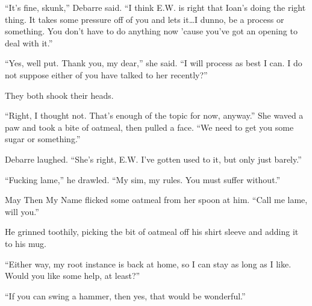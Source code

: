 ``It's fine, skunk,'' Debarre said. ``I think E.W. is right that Ioan's doing the right thing. It takes some pressure off of you and lets it\ldots I dunno, be a process or something. You don't have to do anything now 'cause you've got an opening to deal with it.''

``Yes, well put. Thank you, my dear,'' she said. ``I will process as best I can. I do not suppose either of you have talked to her recently?''

They both shook their heads.

``Right, I thought not. That's enough of the topic for now, anyway.'' She waved a paw and took a bite of oatmeal, then pulled a face. ``We need to get you some sugar or something.''

Debarre laughed. ``She's right, E.W. I've gotten used to it, but only just barely.''

``Fucking lame,'' he drawled. ``My sim, my rules. You must suffer without.''

May Then My Name flicked some oatmeal from her spoon at him. ``Call me lame, will you.''

He grinned toothily, picking the bit of oatmeal off his shirt sleeve and adding it to his mug.

``Either way, my root instance is back at home, so I can stay as long as I like. Would you like some help, at least?''

``If you can swing a hammer, then yes, that would be wonderful.''
